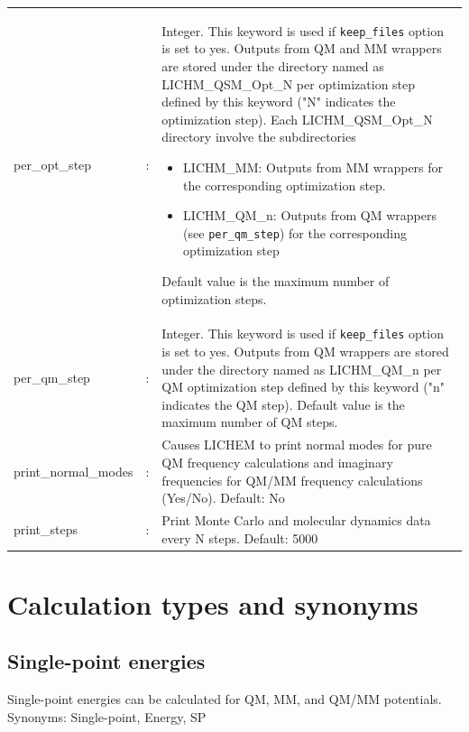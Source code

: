 \documentclass[12pt]{report}
\begin{document}
\begin{center}
\begin{longtable}[c]{ p{4cm} c p{12.5cm}}
per\_opt\_step & : &   
Integer. 
This keyword is used if \texttt{keep\_files} 
option is set to 
yes. 
Outputs from QM and MM wrappers 
are stored under the directory named as 
LICHM\_QSM\_Opt\_N  per 
optimization step defined by this keyword 
("N" indicates the optimization step). 
Each LICHM\_QSM\_Opt\_N directory 
involve the subdirectories 
\begin{itemize}
\item LICHM\_MM: Outputs from MM wrappers 
for the corresponding optimization step.
\item  LICHM\_QM\_n: Outputs from 
QM wrappers (see \texttt{per\_qm\_step})
for the corresponding optimization step
\end{itemize}
Default value is the maximum number of optimization 
steps. \newline \\

per\_qm\_step & : &   
Integer. 
This keyword is used if \texttt{keep\_files} 
option is set to 
yes. Outputs from QM wrappers 
are stored under the directory named as 
LICHM\_QM\_n  per 
QM optimization step defined by this keyword 
("n" indicates the QM step). 
Default value is the maximum number of QM 
steps.\newline \\

print\_normal\_modes & : & Causes LICHEM to print normal modes for pure QM
frequency calculations and imaginary frequencies for QM/MM frequency 
calculations (Yes/No).
Default: No \newline\\

print\_steps & : & Print Monte Carlo and molecular dynamics data every N steps.
Default: 5000 \\
\end{longtable}
\end{center}
\section{Calculation types and synonyms}
\label{sec:CalcTyp}

\subsection{Single-point energies}

Single-point energies can be calculated for QM, MM, and QM/MM potentials.
Synonyms: Single-point, Energy, SP
\end{document}
